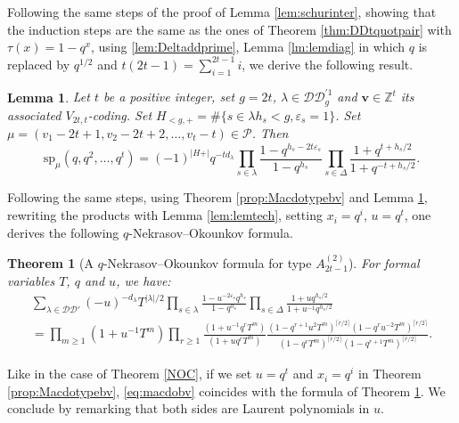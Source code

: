 \documentclass[11pt,letterpaper]{amsart}
\def\bbbz{\mathbb Z}
\def\ccdd{\mathcal {DD}}
\def\ccp{\mathcal P}
\newtheorem{thm}[df]{Theorem}
\newtheorem{lm}[df]{Lemma}
\renewcommand{\sp}{\mathrm{sp}}
\numberwithin{equation}{section}
\numberwithin{df}{section}
\begin{document}
Following the same steps of the proof of Lemma \ref{lem:schurinter}, showing that the induction steps are the same as the ones of Theorem \ref{thm:DDtquotpair} with $\tau(x)=1-q^{x}$, using \eqref{lem:Deltaddprime}, Lemma \ref{lm:lemdiag} in which $q$ is replaced by $q^{1/2}$ and $t(2t-1)=\sum_{i=1}^{2t-1}i$, we derive the following result.
\begin{lm}\label{lem:schurbv}
Let $t$ be a positive integer, set $g=2t$, $\lambda\in\ccdd_{g}^{'1}$ and $\mathbf{v}\in\bbbz^t$ its associated $V_{2t,t}$-coding.
Set $H_{<g,+}=\#\lbrace s\in\lambda h_s<g, \varepsilon_s=1\rbrace$. Set $\mu=(v_1-2t+1,v_2-2t+2,\dots,v_t-t)\in\ccp$. Then
 \begin{equation*}
\sp_{\mu}(q,q^2,\dots,q^t)=(-1)^{\lvert H+\rvert} q^{-td_\lambda}\prod_{s\in\lambda}\frac{1-q^{h_s-2t\varepsilon_s}}{1-q^{h_s}}\prod_{s\in\Delta}\frac{1+q^{t+h_s/2}}{1+q^{-t+h_s/2}}.
 \end{equation*}
 \end{lm}
 
 Following the same steps, using Theorem \ref{prop:Macdotypebv} and Lemma \ref{lem:schurbv}, rewriting the products with Lemma \ref{lem:lemtech}, setting $x_i=q^{i}$, $u=q^{t}$, one derives the following $q$-Nekrasov--Okounkov formula.
\begin{thm}[A $q$-Nekrasov--Okounkov formula for type $A^{(2)}_{2t-1}$]\label{NOBV}
For formal variables $T$, $q$ and $u$, we have:
\begin{multline*}
\sum_{\lambda\in\ccdd'} (-u)^{-d_\lambda}T^{\lvert \lambda\rvert/2}\prod_{s\in\lambda}\frac{1-u^{-2\varepsilon_s}q^{h_s}}{1-q^{h_s}}\prod_{s\in\Delta}\frac{1+uq^{h_s/2}}{1+u^{-1}q^{h_s/2}}\\=
\prod_{m\geq 1}\left(1+u^{-1}T^{m}\right)\prod_{r\geq 1}\frac{\left(1+u^{-1}q^rT^{m}\right)}{\left(1+u q^{r}T^{m}\right)}\frac{ \left(1-q^{r+1}u^{2}T^m\right)^{\lceil r/2 \rceil}\left(1-q^{r}u^{-2}T^m\right)^{\lceil r/2 \rceil}}{\left(1-q^{r}T^m\right)^{\lceil r/2 \rceil}\left(1-q^{r+1}T^m\right)^{\lceil r/2 \rceil}}.
%
\end{multline*}
\end{thm}

Like in the case of Theorem \ref{NOC}, if we set $u=q^{t}$ and $x_i=q^{i}$ in Theorem \ref{prop:Macdotypebv}, \eqref{eq:macdobv} coincides with the formula of Theorem \ref{NOBV}. We conclude by remarking that both sides are Laurent polynomials in $u$.
\end{document}
